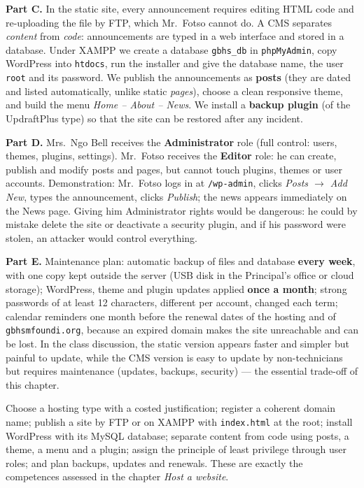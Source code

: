 \documentclass[11pt]{article}
\newcommand{\cle}[1]{{\popxbold\color{popdark}#1}}
\begin{document}
\textbf{Part C.} In the static site, every announcement requires editing HTML code and re-uploading the file by FTP, which Mr.\ Fotso cannot do. A CMS separates \emph{content} from \emph{code}: announcements are typed in a web interface and stored in a database. Under XAMPP we create a database \texttt{gbhs\_db} in \texttt{phpMyAdmin}, copy WordPress into \texttt{htdocs}, run the installer and give the database name, the user \texttt{root} and its password. We publish the announcements as \textbf{posts} (they are dated and listed automatically, unlike static \emph{pages}), choose a clean responsive theme, and build the menu \emph{Home -- About -- News}. We install a \textbf{backup plugin} (of the UpdraftPlus type) so that the site can be restored after any incident.

\textbf{Part D.} Mrs.\ Ngo Bell receives the \textbf{Administrator} role (full control: users, themes, plugins, settings). Mr.\ Fotso receives the \textbf{Editor} role: he can create, publish and modify posts and pages, but cannot touch plugins, themes or user accounts. Demonstration: Mr.\ Fotso logs in at \texttt{/wp-admin}, clicks \emph{Posts $\rightarrow$ Add New}, types the announcement, clicks \emph{Publish}; the news appears immediately on the News page. Giving him Administrator rights would be dangerous: he could by mistake delete the site or deactivate a security plugin, and if his password were stolen, an attacker would control everything.

\textbf{Part E.} Maintenance plan: automatic backup of files and database \textbf{every week}, with one copy kept outside the server (USB disk in the Principal's office or cloud storage); WordPress, theme and plugin updates applied \textbf{once a month}; strong passwords of at least 12 characters, different per account, changed each term; calendar reminders one month before the renewal dates of the hosting and of \texttt{gbhsmfoundi.org}, because an expired domain makes the site unreachable and can be lost. In the class discussion, the static version appears faster and simpler but painful to update, while the CMS version is easy to update by non-technicians but requires maintenance (updates, backups, security) --- the essential trade-off of this chapter.

\begin{aretenir}
Choose a hosting type with a costed justification; register a coherent domain name; publish a site by FTP or on XAMPP with \texttt{index.html} at the root; install WordPress with its MySQL database; separate content from code using posts, a theme, a menu and a plugin; assign the principle of \cle{least privilege} through user roles; and plan backups, updates and renewals. These are exactly the competences assessed in the chapter \emph{Host a website}.
\end{aretenir}
\end{document}
